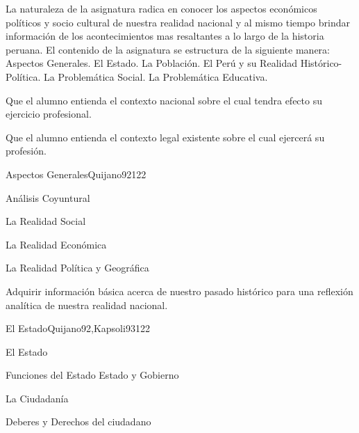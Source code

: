 \begin{syllabus}


\begin{justification}
La naturaleza de la asignatura radica en conocer los aspectos económicos políticos y socio cultural de nuestra realidad nacional y al mismo tiempo brindar información de los acontecimientos mas resaltantes a lo largo de la historia peruana. El contenido de la asignatura se estructura de la siguiente manera: Aspectos Generales. El Estado. La Población. El Perú y su Realidad Histórico-Política. La Problemática Social. La Problemática Educativa.
\end{justification}

\begin{goals}
\item Que el alumno entienda el contexto nacional sobre el cual tendra efecto su ejercicio profesional.
\item Que el alumno entienda el contexto legal existente sobre el cual ejercerá su profesión.
\end{goals}

\begin{outcomes}
\end{outcomes}

\begin{unit}{Aspectos Generales}{Quijano92}{12}{2}
\begin{topics}
	\item Análisis Coyuntural
  	\item La Realidad Social
  	\item La Realidad Económica
  	\item La Realidad Política y Geográfica
\end{topics}

\begin{learningoutcomes}
      \item  Adquirir información básica acerca de nuestro pasado histórico para una reflexión analítica de nuestra realidad nacional.
   \end{learningoutcomes}
\end{unit}

\begin{unit}{El Estado}{Quijano92,Kapsoli93}{12}{2}
\begin{topics}
	\item El Estado
	\item Funciones del Estado Estado y Gobierno
	\item La Ciudadanía
	\item Deberes y Derechos del ciudadano
\end{topics}


\end{unit}
\end{syllabus}
